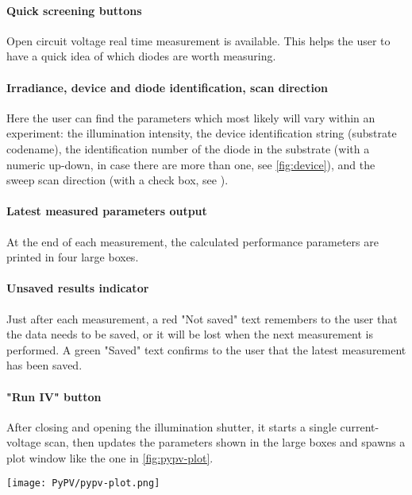 		\paragraph{Quick screening buttons}
		Open circuit voltage real time measurement is available.
		This helps the user to have a quick idea of which diodes are worth measuring.

		\paragraph{Irradiance, device and diode identification, scan direction}
		Here the user can find the parameters which most likely will vary within an experiment: the illumination intensity, the device identification string (substrate codename), the identification number of the diode in the substrate (with a numeric up-down, in case there are more than one, see \cref{fig:device}), and the sweep scan direction (with a check box, see ).

		\paragraph{Latest measured parameters output}
		At the end of each measurement, the calculated performance parameters are printed in four large boxes.

		\paragraph{Unsaved results indicator}
		Just after each measurement, a red "Not saved" text remembers to the user that the data needs to be saved, or it will be lost when the next measurement is performed.
		A green "Saved" text confirms to the user that the latest measurement has been saved.

		\paragraph{"Run IV" button}
		After closing and opening the illumination shutter, it starts a single current\hyp{}voltage scan, then updates the parameters shown in the large boxes and spawns a plot window like the one in \cref{fig:pypv-plot}.

		\begin{SCfigure}
			\centering
			\texttt{[image: PyPV/pypv-plot.png]}
			\label{fig:pypv-plot}
		\end{SCfigure}

